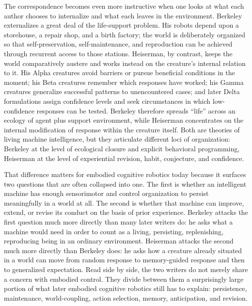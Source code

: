 \documentclass[11pt]{article}
\begin{document}
The correspondence becomes even more instructive when one looks at what each author chooses to internalize and what each leaves in the environment. Berkeley externalizes a great deal of the life-support problem. His robots depend upon a storehouse, a repair shop, and a birth factory; the world is deliberately organized so that self-preservation, self-maintenance, and reproduction can be achieved through recurrent access to those stations. Heiserman, by contrast, keeps the world comparatively austere and works instead on the creature's internal relation to it. His Alpha creatures avoid barriers or pursue beneficial conditions in the moment; his Beta creatures remember which responses have worked; his Gamma creatures generalize successful patterns to unencountered cases; and later Delta formulations assign confidence levels and seek circumstances in which low-confidence responses can be tested. Berkeley therefore spreads ``life'' across an ecology of agent plus support environment, while Heiserman concentrates on the internal modification of response within the creature itself. Both are theories of living machine intelligence, but they articulate different loci of organization: Berkeley at the level of ecological closure and explicit behavioral programming, Heiserman at the level of experiential revision, habit, conjecture, and confidence.

That difference matters for embodied cognitive robotics today because it surfaces two questions that are often collapsed into one. The first is whether an intelligent machine has enough sensorimotor and control organization to persist meaningfully in a world at all. The second is whether that machine can improve, extend, or revise its conduct on the basis of prior experience. Berkeley attacks the first question much more directly than many later writers do: he asks what a machine would need in order to count as a living, persisting, replenishing, reproducing being in an ordinary environment. Heiserman attacks the second much more directly than Berkeley does: he asks how a creature already situated in a world can move from random response to memory-guided response and then to generalized expectation. Read side by side, the two writers do not merely share a concern with embodied control. They divide between them a surprisingly large portion of what later embodied cognitive robotics still has to explain: persistence, maintenance, world-coupling, action selection, memory, anticipation, and revision.
\end{document}
